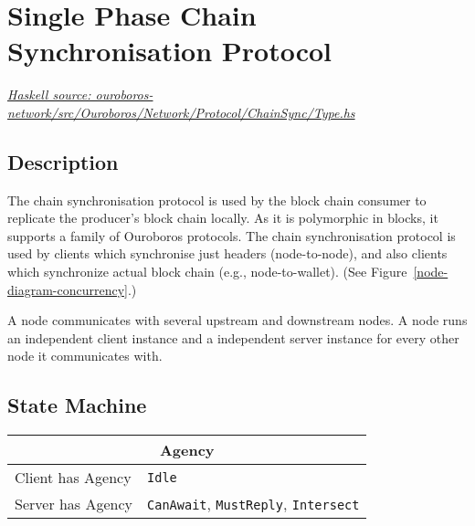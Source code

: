 \documentclass{report}
\newcommand{\hsref}[1]{\href{https://github.com/input-output-hk/ouroboros-network/blob/master/#1}{\emph{Haskell source: #1}}}
\newcommand{\state}[1]{\texttt{#1}}
\newcommand{\msg}[1]{\texttt{#1}}
\newcommand{\Idle}{\state{Idle}}
\theoremstyle{definition}{
  \newtheorem{lemma}{Lemma}[section] %
  \newtheorem{definition}[lemma]{Definition}
}
\theoremstyle{theorem}{
  \newtheorem{invariant}[lemma]{Invariant}
  \newtheorem{proofobligation}[lemma]{Proof Obligation}
}
\numberwithin{equation}{lemma}
\begin{document}
\section{Single Phase Chain Synchronisation Protocol}
\label{chain-sync-protocol}
\hsref{ouroboros-network/src/Ouroboros/Network/Protocol/ChainSync/Type.hs}
\newcommand{\CanAwait}{\state{CanAwait}}
\newcommand{\MustReply}{\state{MustReply}}
\newcommand{\Intersect}{\state{Intersect}}
\newcommand{\RequestNext}{\msg{RequestNext}}
\newcommand{\AwaitReply}{\msg{AwaitReply}}
\newcommand{\RollForward}{\msg{RollForward}}
\newcommand{\RollBackward}{\msg{RollBackward}}
\newcommand{\FindIntersect}{\msg{FindIntersect}}
\newcommand{\IntersectImproved}{\msg{IntersectImproved}}
\newcommand{\IntersectUnchanged}{\msg{IntersectUnchanged}}

\subsection{Description}
The chain synchronisation protocol is used by the block chain consumer
to replicate the producer's block chain locally. As it is polymorphic in blocks,
it supports a family of Ouroboros protocols.
The chain synchronisation protocol is used by clients which synchronise just headers (node-to-node),
and also clients which synchronize actual block chain (e.g., node-to-wallet).
(See Figure~\ref{node-diagram-concurrency}.)

A node communicates with several upstream and downstream nodes.
A node runs an independent client instance and a independent server instance for every
other node it communicates with.

\subsection{State Machine}

\begin{tabular}{|l|l|}
  \hline
  \multicolumn{2}{|c|}{Agency} \\ \hline
  Client has Agency & \Idle \\  \hline
  Server has Agency & \CanAwait, \MustReply, \Intersect \\ \hline
\end{tabular}
\end{document}
